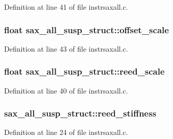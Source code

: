 Definition at line 41 of file instrsaxall.\+c.

\subsubsection[{\texorpdfstring{offset\+\_\+scale}{offset_scale}}]{\setlength{\rightskip}{0pt plus 5cm}float sax\+\_\+all\+\_\+susp\+\_\+struct\+::offset\+\_\+scale}\hypertarget{structsax__all__susp__struct_a96f06f16fad64c3c198ca0a1df3ae44d}{}\label{structsax__all__susp__struct_a96f06f16fad64c3c198ca0a1df3ae44d}


Definition at line 43 of file instrsaxall.\+c.

\subsubsection[{\texorpdfstring{reed\+\_\+scale}{reed_scale}}]{\setlength{\rightskip}{0pt plus 5cm}float sax\+\_\+all\+\_\+susp\+\_\+struct\+::reed\+\_\+scale}\hypertarget{structsax__all__susp__struct_aba6cc1acbdf8da4318fc3323e4b98f05}{}\label{structsax__all__susp__struct_aba6cc1acbdf8da4318fc3323e4b98f05}


Definition at line 40 of file instrsaxall.\+c.

\subsubsection[{\texorpdfstring{reed\+\_\+stiffness}{reed_stiffness}}]{ sax\+\_\+all\+\_\+susp\+\_\+struct\+::reed\+\_\+stiffness}\hypertarget{structsax__all__susp__struct_ac3eabb85148bc2c9312208efedee19a1}{}\label{structsax__all__susp__struct_ac3eabb85148bc2c9312208efedee19a1}


Definition at line 24 of file instrsaxall.\+c.

